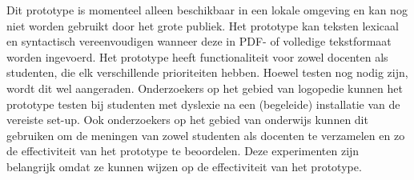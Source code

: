 \medspace

Dit prototype is momenteel alleen beschikbaar in een lokale omgeving en kan nog niet worden gebruikt door het grote publiek. Het prototype kan teksten lexicaal en syntactisch vereenvoudigen wanneer deze in PDF- of volledige tekstformaat worden ingevoerd. Het prototype heeft functionaliteit voor zowel docenten als studenten, die elk verschillende prioriteiten hebben. Hoewel testen nog nodig zijn, wordt dit wel aangeraden. Onderzoekers op het gebied van logopedie kunnen het prototype testen bij studenten met dyslexie na een (begeleide) installatie van de vereiste set-up. Ook onderzoekers op het gebied van onderwijs kunnen dit gebruiken om de meningen van zowel studenten als docenten te verzamelen en zo de effectiviteit van het prototype te beoordelen. Deze experimenten zijn belangrijk omdat ze kunnen wijzen op de effectiviteit van het prototype.

